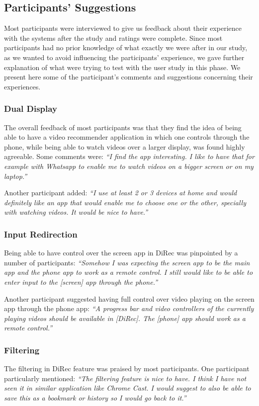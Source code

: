 \subsection{Participants' Suggestions}
Most participants were interviewed to give us feedback about their experience
with the systems after the study and ratings were complete. Since most
participants had no prior knowledge of what exactly we were after in our study,
as we wanted to avoid influencing the participants' experience, we gave further
explanation of what were trying to test with the user study in this phase.
We present here some of the participant's comments and suggestions concerning their
experiences.
\subsubsection{Dual Display}
The overall feedback of most participants was that they find the idea of being
able to have a video recommender application in which one controls through the
phone, while being able to watch videos over a larger display, was found highly
agreeable. Some comments were: \textit{``I find the app interesting. I like to
have that for example with Whatsapp to enable me to watch videos on a bigger screen or on my laptop.''}\par
Another participant added: \textit{``I use at least 2 or 3 devices at home and
would definitely like an app that would enable me to choose one or the other, specially with watching videos. It
would be nice to have.''}  
\subsubsection{Input Redirection}
Being able to have control over the screen app in DiRec was pinpointed by a
number of participants: \textit{``Somehow I was expecting the screen app to be
the main app and the phone app to work as a remote control. I still would like to be able to
enter input to the [screen] app through the phone.''}\par
Another participant suggested having full control over video playing on the
screen app through the phone app: \textit{``A progress bar and video controllers
of the currently playing videos should be available in [DiRec]. The [phone] app should work as a remote
control.''}
\subsubsection{Filtering}
The filtering in DiRec feature was praised by most participants. One participant
particularly mentioned: \textit{``The filtering feature is nice to have. I think
I have not seen it in similar application like Chrome Cast. I would suggest to also be able to save this as
a bookmark or history so I would go back to it.''}
